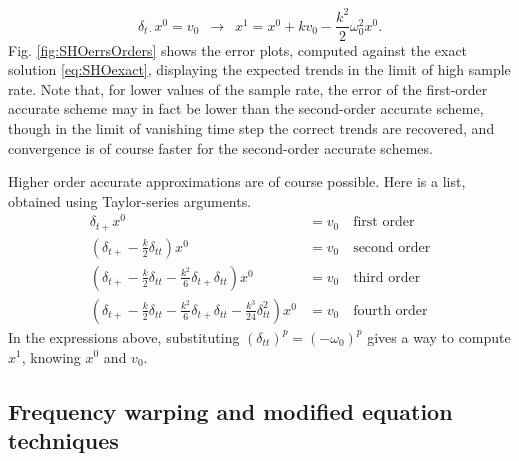 \documentclass[11pt,twoside,a4paper,english]{book}
\newcommand{\om}{\omega}
\newcommand{\dtp}{\delta_{t+}}
\newcommand{\dtd}{\delta_{t\cdot}}
\newcommand{\dtt}{\delta_{tt}}
\begin{document}
\begin{equation}
    \dtd x^0 = v_0 \,\,\, \rightarrow \,\,\, x^1 = x^0 + kv_0 - \frac{k^2}{2}\om_0^2x^0.
\end{equation}
Fig. \ref{fig:SHOerrsOrders} shows the error plots, computed against the exact solution \eqref{eq:SHOexact}, displaying the expected  trends in the limit of high sample rate. Note that, for lower values of the sample rate, the error of the first-order accurate scheme may in fact be lower than the second-order accurate scheme, though in the limit of vanishing time step the correct trends are recovered, and convergence is of course faster for the second-order accurate schemes.  

Higher order accurate approximations are of course possible. Here is a list, obtained using Taylor-series arguments. 
\begin{align}\label{eq:HigherOrderICsOscillator}
\dtp x^0 &= v_0 \quad \text{first order}\\
\left(\dtp -\frac{k}{2}\dtt \right) x^0 &= v_0 \quad \text{second order}\\
\left(\dtp -\frac{k}{2}\dtt - \frac{k^2}{6}\dtp \dtt \right) x^0 &= v_0 \quad \text{third order}\\
\left(\dtp -\frac{k}{2}\dtt - \frac{k^2}{6}\dtp \dtt - \frac{k^3}{24}\dtt^2 \right) x^0 &= v_0 \quad \text{fourth order}
\end{align}
In the expressions above, substituting $(\dtt)^p = (-\omega_0)^p$ gives a way to compute $x^1$, knowing $x^0$ and $v_0$. 


\subsection{Frequency warping and modified equation techniques}\label{eq:ModEqTechniques}
\end{document}
